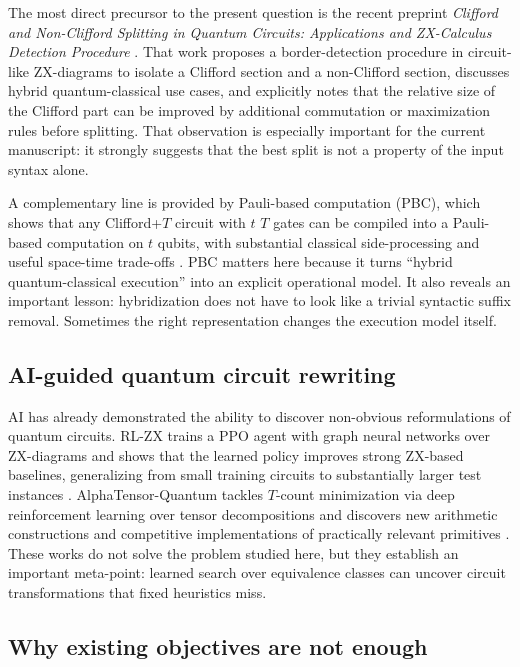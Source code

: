 \documentclass[11pt]{article}
\theoremstyle{remark}
\begin{document}
The most direct precursor to the present question is the recent preprint \emph{Clifford and Non-Clifford Splitting in Quantum Circuits: Applications and ZX-Calculus Detection Procedure} \cite{splitting_2025}. That work proposes a border-detection procedure in circuit-like ZX-diagrams to isolate a Clifford section and a non-Clifford section, discusses hybrid quantum-classical use cases, and explicitly notes that the relative size of the Clifford part can be improved by additional commutation or maximization rules before splitting. That observation is especially important for the current manuscript: it strongly suggests that the best split is not a property of the input syntax alone.

A complementary line is provided by Pauli-based computation (PBC), which shows that any Clifford+$T$ circuit with $t$ $T$ gates can be compiled into a Pauli-based computation on $t$ qubits, with substantial classical side-processing and useful space-time trade-offs \cite{peres_galvao_2023}. PBC matters here because it turns ``hybrid quantum-classical execution'' into an explicit operational model. It also reveals an important lesson: hybridization does not have to look like a trivial syntactic suffix removal. Sometimes the right representation changes the execution model itself.

\subsection{AI-guided quantum circuit rewriting}

AI has already demonstrated the ability to discover non-obvious reformulations of quantum circuits. RL-ZX trains a PPO agent with graph neural networks over ZX-diagrams and shows that the learned policy improves strong ZX-based baselines, generalizing from small training circuits to substantially larger test instances \cite{rlzx_2025}. AlphaTensor-Quantum tackles $T$-count minimization via deep reinforcement learning over tensor decompositions and discovers new arithmetic constructions and competitive implementations of practically relevant primitives \cite{alphatensor_2025}. These works do not solve the problem studied here, but they establish an important meta-point: learned search over equivalence classes can uncover circuit transformations that fixed heuristics miss.

\subsection{Why existing objectives are not enough}
\end{document}
